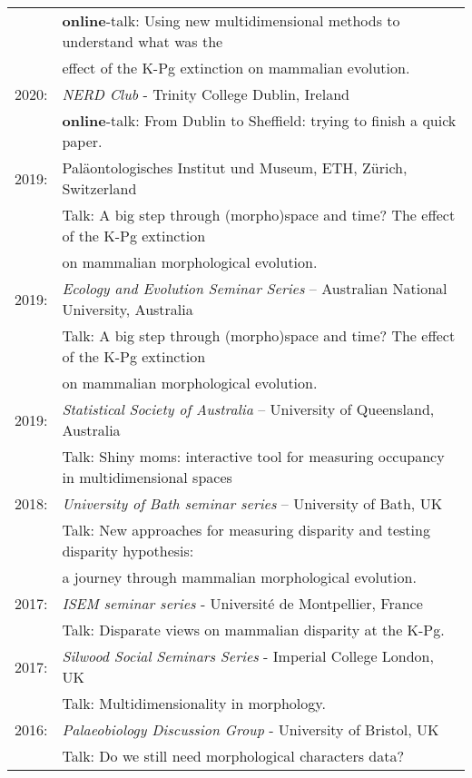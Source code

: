 \documentclass[10pt,a4paper]{article}
\begin{document}
{\begin{tabular}{ll}
      & \textbf{online}-talk: Using new multidimensional methods to understand what was the\\
      & effect of the K-Pg extinction on mammalian evolution.\\
2020: & \textit{NERD Club} - Trinity College Dublin, Ireland\\
      & \textbf{online}-talk: From Dublin to Sheffield: trying to finish a quick paper.\\
2019: & Pal\"{a}ontologisches Institut und Museum, ETH, Z\"{u}rich, Switzerland\\
      & Talk: A big step through (morpho)space and time? The effect of the K-Pg extinction\\
      & on mammalian morphological evolution.\\
2019: & \textit{Ecology and Evolution Seminar Series} – Australian National University, Australia\\
      & Talk: A big step through (morpho)space and time? The effect of the K-Pg extinction\\
      & on mammalian morphological evolution.\\
2019: & \textit{Statistical Society of Australia} – University of Queensland, Australia\\
      & Talk: Shiny moms: interactive tool for measuring occupancy in multidimensional spaces\\
2018: & \textit{University of Bath seminar series} – University of Bath, UK\\
      & Talk: New approaches for measuring disparity and testing disparity hypothesis:\\
      & a journey through mammalian morphological evolution.\\
2017: & \textit{ISEM seminar series} - Universit\'{e} de Montpellier, France\\
      & Talk: Disparate views on mammalian disparity at the K-Pg.\\ 
2017: & \textit{Silwood Social Seminars Series} - Imperial College London, UK\\
      & Talk: Multidimensionality in morphology.\\ 
2016: & \textit{Palaeobiology Discussion Group} - University of Bristol, UK\\
      & Talk: Do we still need morphological characters data?\\ 
\end{tabular}

}
\end{document}
